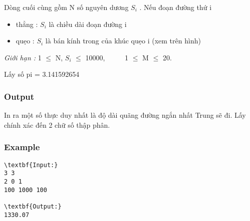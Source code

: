 Dòng cuối cùng gồm N số nguyên dương $S_{i}$ . Nếu đoạn đường thứ i
\begin{itemize}
	\item thẳng : $S_{i}$ là chiều dài đoạn đường i
	\item quẹo : $S_{i}$ là bán kính trong của khúc quẹo i (xem trên hình)
\end{itemize}

\emph{Giới hạn : } 1  $\le$  N, $S_{i}$  $\le$  10000,       1  $\le$  M  $\le$  20.

Lấy số pi = 3.141592654

\subsubsection{Output}

In ra một số thực duy nhất là độ dài quãng đường ngắn nhất Trung sẽ đi. Lấy chính xác đến 2 chữ số thập phân.

\subsubsection{Example}
\begin{verbatim}
\textbf{Input:}
3 3
2 0 1
100 1000 100

\textbf{Output:}
1330.07\end{verbatim}
